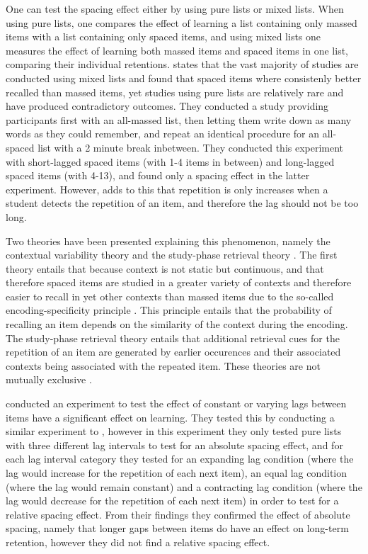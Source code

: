 One can test the spacing effect either by using pure lists or mixed lists. When using pure lists, one compares the effect of learning a list containing only massed items with a list containing only spaced items, and using mixed lists one measures the effect of learning both massed items and spaced items in one list, comparing their individual retentions.  states that the vast majority of studies are conducted using mixed lists and found that spaced items where consistenly better recalled than massed items, yet studies using pure lists are relatively rare and have produced contradictory outcomes. They conducted a study providing participants first with an all-massed list, then letting them write down as many words as they could remember, and repeat an identical procedure for an all-spaced list with a 2 minute break inbetween. They conducted this experiment with short-lagged spaced items (with 1-4 items in between) and long-lagged spaced items (with 4-13), and found only a spacing effect in the latter experiment. However,  adds to this that repetition is only increases when a student detects the repetition of an item, and therefore the lag should not be too long.

Two theories have been presented explaining this phenomenon, namely the contextual variability theory and the study-phase retrieval theory \cite{siegel}. The first theory entails that because context is not static but continuous, and that therefore spaced items are studied in a greater variety of contexts and therefore easier to recall in yet other contexts than massed items due to the so-called encoding-specificity principle \cite{cognitivepsychology}. This principle entails that the probability of recalling an item depends on the similarity of the context during the encoding. The study-phase retrieval theory entails that additional retrieval cues for the repetition of an item are generated by earlier occurences and their associated contexts being associated with the repeated item. These theories are not mutually exclusive \cite{siegel}.

 conducted an experiment to test the effect of constant or varying lags between items have a significant effect on learning. They tested this by conducting a similar experiment to , however in this experiment they only tested pure lists with three different lag intervals to test for an absolute spacing effect, and for each lag interval category they tested for an expanding lag condition (where the lag would increase for the repetition of each next item), an equal lag condition (where the lag would remain constant) and a contracting lag condition (where the lag would decrease for the repetition of each next item) in order to test for a relative spacing effect. From their findings they confirmed the effect of absolute spacing, namely that longer gaps between items do have an effect on long-term retention, however they did not find a relative spacing effect.

